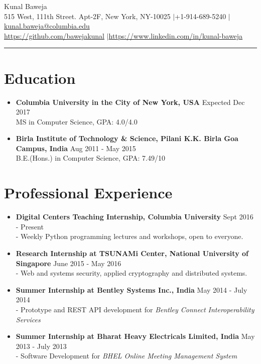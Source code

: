 \documentclass{article}
\def\name{Kunal Baweja}
\begin{document}
\begin{center}
{\huge \name}\\
515 West, 111th Street. Apt-2F, New York, NY-10025 $|$\hspace{3pt}+1-914-689-5240 $|$\hspace{3pt}\href{mailto:kunal.baweja@columbia.edu}{kunal.baweja@columbia.edu}\\
\vspace{2pt}
\href{https://github.com/bawejakunal}{https://github.com/bawejakunal} $|$\hspace{3pt}\href{https://www.linkedin.com/in/kunal-baweja}{https://www.linkedin.com/in/kunal-baweja}
\end{center}

\hrule
\vspace{5pt}

\section*{Education}
\begin{itemize}
    
    \item \textbf{Columbia University in the City of New York, USA} {\hfill Expected Dec 2017}\\
    MS in Computer Science, GPA: 4.0/4.0
    
    \item \textbf{Birla Institute of Technology \& Science, Pilani K.K. Birla Goa Campus, India} {\hfill Aug 2011 - May 2015}\\
    B.E.(Hons.) in Computer Science, GPA: 7.49/10

\end{itemize}

\section*{Professional Experience}
\begin{itemize}
    \item \textbf{Digital Centers Teaching Internship, Columbia University} {\hfill Sept 2016 - Present}\\
    - Weekly Python programming lectures and workshops, open to everyone.

    \item \textbf{Research Internship at TSUNAMi Center, National University of Singapore} {\hfill June 2015 - May 2016}\\
    - Web and systems security, applied cryptography and distributed systems.
    
    \item \textbf{Summer Internship at Bentley Systems Inc., India} {\hfill May 2014 - July 2014}\\
    - Prototype and REST API development for \textit{Bentley Connect Interoperability Services}

    \item \textbf{Summer Internship at Bharat Heavy Electricals Limited, India} {\hfill May 2013 - July 2013}\\
    - Software Development for \textit{BHEL Online Meeting Management System}
\end{itemize}
\end{document}
